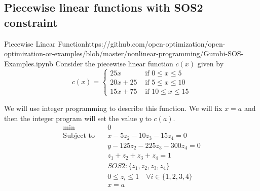 \subsection{Piecewise linear functions with SOS2 constraint}
\begin{examplewithcode}{Piecewise Linear Function}{https://github.com/open-optimization/open-optimization-or-examples/blob/master/nonlinear-programming/Gurobi-SOS-Examples.ipynb}
\label{example:pwl}
Consider the piecewise linear function 
 $c(x)$ given by
$$
c(x) = 
\begin{cases}
25x  & \text{ if } 0 \leq x \leq 5\\
20x + 25 & \text{ if } 5 \leq x \leq 10\\
15x + 75 & \text{ if } 10 \leq x \leq 15
\end{cases}
$$


We will use integer programming to describe this function.  We will fix $x = a$ and then the integer program will set the value $y$ to $c(a)$.
\begin{align*}
\min\quad & 0\\
\text{Subject to} \quad & x - 5 z_{2} - 10 z_{3} - 15 z_{4} = 0\\
 & y - 125 z_{2} - 225 z_{3} - 300 z_{4} = 0\\
 & z_{1} + z_{2} + z_{3} + z_{4} = 1\\
 & SOS2: \{z_1, z_2, z_3, z_4\}\\
 & 0 \leq z_{i} \leq 1 \quad\forall i \in \{1,2,3,4\}\\
 & x = a\\
\end{align*}

\end{examplewithcode}

